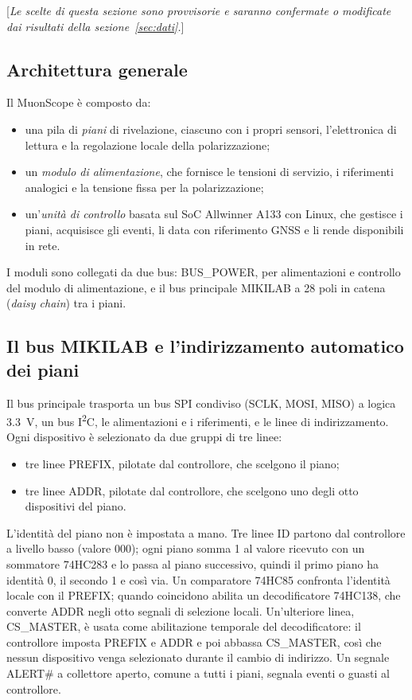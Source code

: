 \documentclass[11pt,a4paper]{article}
\newcommand{\dadefinire}[1]{\textcolor{red!70!black}{[\emph{#1}]}}
\begin{document}
\dadefinire{Le scelte di questa sezione sono provvisorie e saranno confermate o modificate dai risultati della sezione~\ref{sec:dati}.}

\subsection{Architettura generale}

Il MuonScope è composto da:
\begin{itemize}
  \item una pila di \emph{piani} di rivelazione, ciascuno con i propri sensori, l'elettronica di lettura e la regolazione locale della polarizzazione;
  \item un \emph{modulo di alimentazione}, che fornisce le tensioni di servizio, i riferimenti analogici e la tensione fissa per la polarizzazione;
  \item un'\emph{unità di controllo} basata sul SoC Allwinner A133 con Linux, che gestisce i piani, acquisisce gli eventi, li data con riferimento GNSS e li rende disponibili in rete.
\end{itemize}
I moduli sono collegati da due bus: BUS\_POWER, per alimentazioni e controllo del modulo di alimentazione, e il bus principale MIKILAB a 28 poli in catena (\emph{daisy chain}) tra i piani.

\subsection{Il bus MIKILAB e l'indirizzamento automatico dei piani}\label{sec:bus}

Il bus principale trasporta un bus SPI condiviso (SCLK, MOSI, MISO) a logica \SI{3.3}{\volt}, un bus I\textsuperscript{2}C, le alimentazioni e i riferimenti, e le linee di indirizzamento. Ogni dispositivo è selezionato da due gruppi di tre linee:
\begin{itemize}
  \item tre linee PREFIX, pilotate dal controllore, che scelgono il piano;
  \item tre linee ADDR, pilotate dal controllore, che scelgono uno degli otto dispositivi del piano.
\end{itemize}
L'identità del piano non è impostata a mano. Tre linee ID partono dal controllore a livello basso (valore 000); ogni piano somma 1 al valore ricevuto con un sommatore 74HC283 e lo passa al piano successivo, quindi il primo piano ha identità 0, il secondo 1 e così via. Un comparatore 74HC85 confronta l'identità locale con il PREFIX; quando coincidono abilita un decodificatore 74HC138, che converte ADDR negli otto segnali di selezione locali. Un'ulteriore linea, CS\_MASTER, è usata come abilitazione temporale del decodificatore: il controllore imposta PREFIX e ADDR e poi abbassa CS\_MASTER, così che nessun dispositivo venga selezionato durante il cambio di indirizzo. Un segnale ALERT\# a collettore aperto, comune a tutti i piani, segnala eventi o guasti al controllore.
\end{document}
